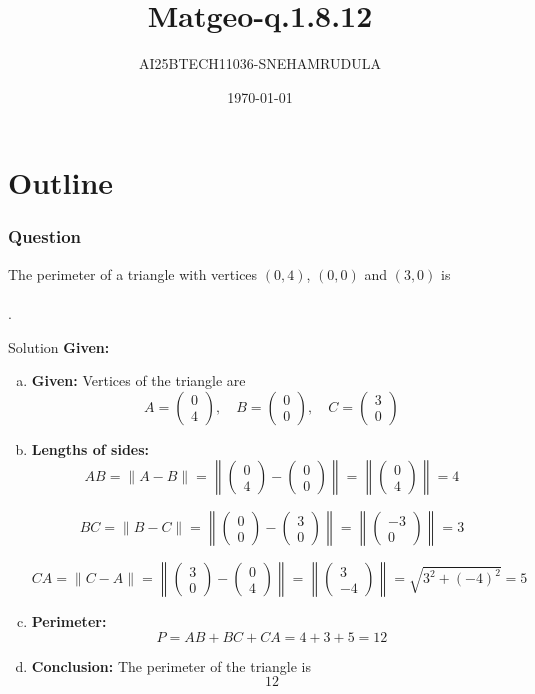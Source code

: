 \documentclass{beamer}
\title{Matgeo-q.1.8.12}
\author{AI25BTECH11036-SNEHAMRUDULA}
\date{\today}
\theoremstyle{remark}
\newcommand{\myvec}[1]{\ensuremath{\begin{pmatrix}#1\end{pmatrix}}}
\begin{document}
\begin{frame}
\titlepage
\end{frame}

\section*{Outline}


\begin{frame}
\frametitle{Question}
The perimeter of a triangle with vertices $(0, 4)$, $(0, 0)$ and $(3, 0)$ is \\\\.

\end{frame}
%
\begin{frame}[t]{Solution}
\small
\textbf{Given:}\;
\begin{enumerate}[a)]
    \item \textbf{Given:}  
    Vertices of the triangle are  
    \[
    A = \myvec{0\\4},\quad 
    B = \myvec{0\\0},\quad 
    C = \myvec{3\\0}
    \]

    \item \textbf{Lengths of sides:}
    \[
    AB = \|A-B\| = \left\|\myvec{0\\4}-\myvec{0\\0}\right\|
    = \left\|\myvec{0\\4}\right\| = 4
    \]

    \[
    BC = \|B-C\| = \left\|\myvec{0\\0}-\myvec{3\\0}\right\|
    = \left\|\myvec{-3\\0}\right\| = 3
    \]

    \[
    CA = \|C-A\| = \left\|\myvec{3\\0}-\myvec{0\\4}\right\|
    = \left\|\myvec{3\\-4}\right\|
    = \sqrt{3^2+(-4)^2} = 5
    \]

    \item \textbf{Perimeter:}
    \[
    P = AB+BC+CA = 4+3+5=12
    \]

    \item \textbf{Conclusion:}  
    The perimeter of the triangle is
    \[
    \boxed{12}
    \]
\end{enumerate}
\end{frame}
\end{document}
